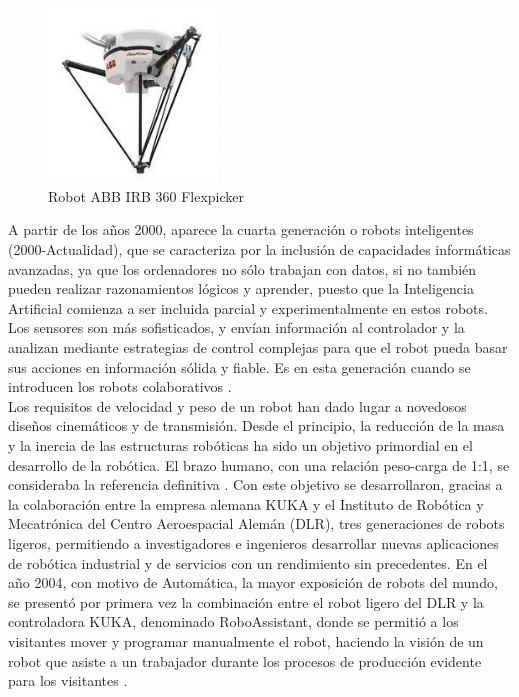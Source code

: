   \begin{figure} [H]
    \begin{center}
      \includegraphics[width=45mm]{figs/flexpicker_ABB.jpeg}
    \end{center}
    \caption{Robot ABB IRB 360 Flexpicker}
    \label{fig:Flexpicker_ABB}
  \end{figure}
  
A partir de los años 2000, aparece la cuarta generación o robots inteligentes (2000-Actualidad), que se caracteriza por la inclusión de capacidades informáticas avanzadas, ya que los ordenadores no sólo trabajan con datos, si no también pueden realizar razonamientos lógicos y aprender, puesto que la Inteligencia Artificial comienza a ser incluida parcial y experimentalmente en estos robots. Los sensores son más sofisticados, y envían información al controlador y la analizan mediante estrategias de control complejas para que el robot pueda basar sus acciones en información sólida y fiable. Es en esta generación cuando se introducen los robots colaborativos \cite{Zamalloa17}.\\
  
Los requisitos de velocidad y peso de un robot han dado lugar a novedosos diseños cinemáticos y de transmisión. Desde el principio, la reducción de la masa y la inercia de las estructuras robóticas ha sido un objetivo primordial en el desarrollo de la robótica. El brazo humano, con una relación peso-carga de 1:1, se consideraba la referencia definitiva \cite{Siciliano16}. Con este objetivo se desarrollaron, gracias a la colaboración entre la empresa alemana KUKA y el Instituto de Robótica y Mecatrónica del Centro Aeroespacial Alemán (DLR), tres generaciones de robots ligeros, permitiendo a investigadores e ingenieros desarrollar nuevas aplicaciones de robótica industrial y de servicios con un rendimiento sin precedentes. En el año 2004, con motivo de Automática, la mayor exposición de robots del mundo, se presentó por primera vez la combinación entre el robot ligero del DLR y la controladora KUKA, denominado RoboAssistant, donde se permitió a los visitantes mover y programar manualmente el robot, haciendo la visión de un robot que asiste a un trabajador durante los procesos de producción evidente para los visitantes \cite{Bischoff10}. \\
  

